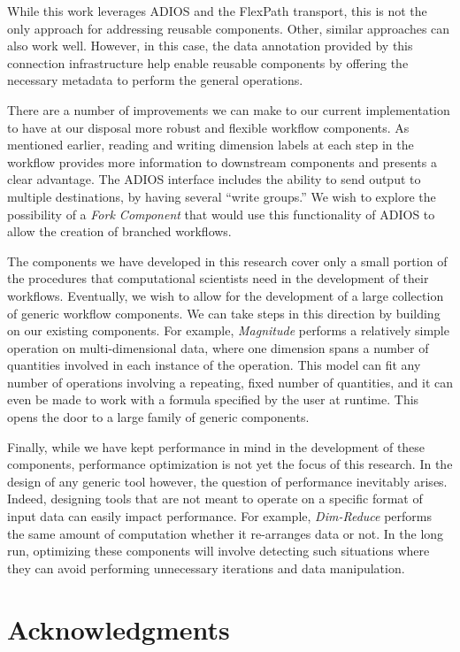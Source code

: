 \documentclass[conference]{IEEEtran}
\begin{document}
While this work leverages ADIOS and the FlexPath transport, this is not the
only approach for addressing reusable components. Other, similar approaches can
also work well. However, in this case, the data annotation provided by this
connection infrastructure help enable reusable components by offering the
necessary metadata to perform the general operations.

There are a number of improvements we can make to our current implementation to
have at our disposal more robust and flexible workflow components. As mentioned
earlier, reading and writing dimension labels at each step in the workflow
provides more information to downstream components and presents a clear
advantage. The ADIOS interface includes the ability to send output to multiple
destinations, by having several ``write groups.'' We wish to explore the
possibility of a {\em Fork Component} that would use this functionality of
ADIOS to allow the creation of branched workflows.

The components we have developed in this research cover only a small portion of
the procedures that computational scientists need in the development of their
workflows. Eventually, we wish to allow for the development of a large
collection of generic workflow components. We can take steps in this direction
by building on our existing components. For example, {\em Magnitude} performs a
relatively simple operation on multi-dimensional data, where one dimension
spans a number of quantities involved in each instance of the operation. This
model can fit any number of operations involving a repeating, fixed number of
quantities, and it can even be made to work with a formula specified by the
user at runtime. This opens the door to a large family of generic components.

Finally, while we have kept performance in mind in the development of these
components, performance optimization is not yet the focus of this research. In
the design of any generic tool however, the question of performance inevitably
arises. Indeed, designing tools that are not meant to operate on a specific
format of input data can easily impact performance. For example, {\em
Dim-Reduce} performs the same amount of computation whether it re-arranges data
or not. In the long run, optimizing these components will involve detecting
such situations where they can avoid performing unnecessary iterations and data
manipulation.

\section*{Acknowledgments}
\end{document}
